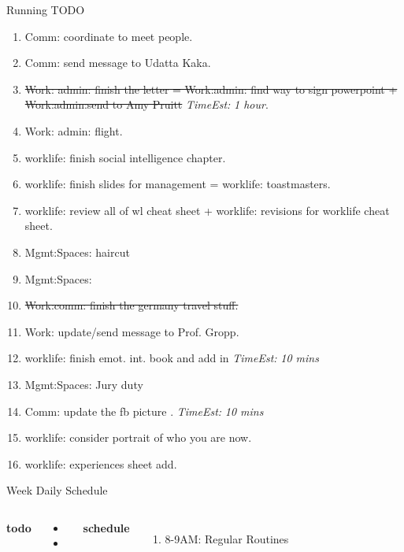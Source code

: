 \documentclass[serif, mathserif, final]{beamer}
\newcommand{\doneTask}[1]{\tiny \item \tiny \sout{#1}}
\newcommand{\te}[1]{\textit{TimeEst:} \textit{#1}}
\begin{document}
\begin{frame}{}
\begin{columns}
\begin{column}{0.50\linewidth}
\begin{block}{Running TODO}
        \begin{enumerate} 
        \item \small Comm: coordinate to meet people. 
        \item \small Comm: send message to Udatta Kaka. 
        \doneTask{ Work: admin: finish the letter  = Work:admin: find
          way to sign powerpoint  + Work:admin:send to Amy Pruitt} \te{1
            hour}. 
        \item \small Work: admin: flight. 
        \item \small worklife: finish social intelligence chapter. 
        \item \small worklife: finish slides for management  =
          worklife: toastmasters. 
        \item \small worklife: review all of wl cheat sheet  + worklife:
          revisions for worklife cheat sheet. 
        \item \small Mgmt:Spaces: haircut 
        \item \small Mgmt:Spaces:  
          \doneTask{ Work:comm: finish the germany travel stuff. }


        \item \small Work: update/send message to Prof. Gropp. 
        \item \small worklife: finish emot. int. book and add in
          \te{10 mins} 
        \item \small Mgmt:Spaces: Jury duty           
        \item \small Comm: update the fb picture . \te{10 mins} 


        \item \small worklife: consider portrait of who you are now. 
        \item \small worklife: experiences sheet add.
        \end{enumerate} 
      \end{block} 
      
      \begin{block}{Week Daily Schedule}
        
        \begin{columns} 
          \textbf{\small todo} \\ 
          \begin{itemize}
            \tiny \item \tiny 
          \item \tiny 
          \end{itemize} 
          \textbf{\small schedule} \\
          \begin{enumerate} 
            \tiny \item \tiny 8-9AM: Regular Routines 
          \end{enumerate} 


\end{columns}
\end{block}
\end{column}
\end{columns}
\end{frame}
\end{document}

